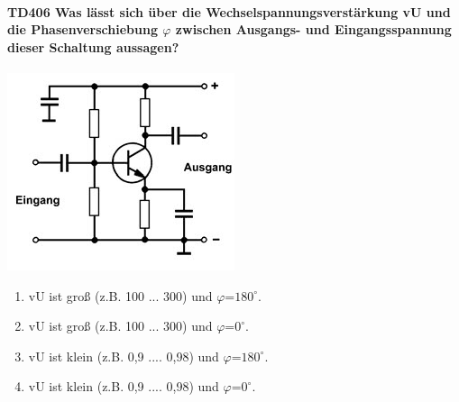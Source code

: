 \documentclass[8pt]{article}
\begin{document}
\begin{enumerate}
\begin{enumerate}[nolistsep,label=\Alph*]
\paragraph*{TD406 Was lässt sich über die Wechselspannungsverstärkung vU und die Phasenverschiebung $\varphi$ zwischen Ausgangs- und Eingangsspannung dieser Schaltung aussagen?}
\begin{center}
	\begin{minipage}{\linewidth}
		\centering
		\includegraphics[scale=1.0]{pics/td406_a.jpg}
	\end{minipage}
\end{center}
\begin{enumerate}[nolistsep,label=\Alph*]
\item vU ist groß (z.B. 100 ... 300) und $\varphi$=$180^{\circ}$.
\item vU ist groß (z.B. 100 ... 300) und $\varphi$=$0^{\circ}$.
\item vU ist klein (z.B. 0,9 .... 0,98) und $\varphi$=$180^{\circ}$.
\item vU ist klein (z.B. 0,9 .... 0,98) und $\varphi$=$0^{\circ}$.
\end{enumerate}


\end{enumerate}
\end{enumerate}
\end{document}
